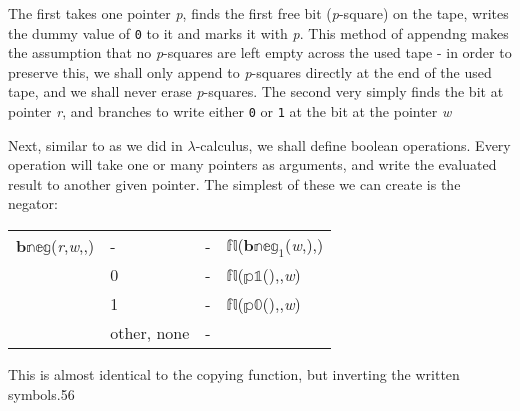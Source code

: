\documentclass[Master.tex]{subfiles}
\begin{document}
\medskip

The first takes one pointer \textit{p}, finds the first free bit (\textit{p}-square) on the tape, writes the dummy value of \texttt{0} to it and marks it with \textit{p}. This method of appendng makes the assumption that no \textit{p}-squares are left empty across the used tape - in order to preserve this, we shall only append to \textit{p}-squares directly at the end of the used tape, and we shall never erase \textit{p}-squares. The second very simply finds the bit at pointer \textit{r}, and branches to write either \texttt{0} or \texttt{1} at the bit at the pointer \textit{w}

Next, similar to as we did in $\lambda$-calculus, we shall define boolean operations. Every operation will take one or many pointers as arguments, and write the evaluated result to another given pointer. The simplest of these we can create is the negator:

\medskip\noindent\begin{tabu} to \textwidth{XXXX}
    $\mathbb{\mathbf{b}neg}$(\textit{r},\textit{w},,)   & - & - & $\mathbb{fl}$($\mathbb{\mathbf{b}neg}_1$(\textit{w},),) \\
    \hhline{----}
     & 0 & - & $\mathbb{fl}$($\mathbb{p1}$(),,\textit{w}) \\
                                                                                       & 1 & - & $\mathbb{fl}$($\mathbb{p0}$(),,\textit{w}) \\ 
                                                                                       & other, none & - &  \\
\end{tabu}

\medskip

This is almost identical to the copying function, but inverting the written symbols.56
\end{document}
